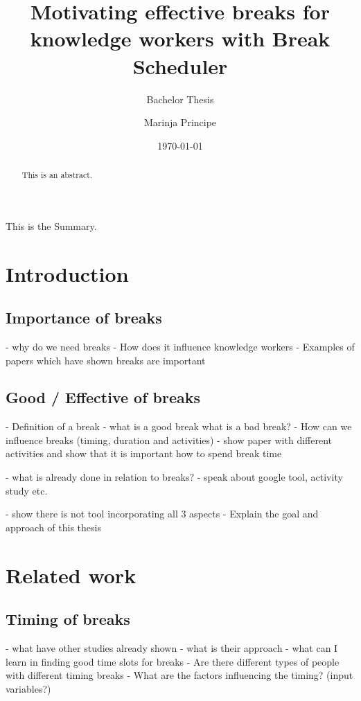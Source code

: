 \documentclass{hasel_thesis}
\date{\today}
\title{Motivating effective breaks for knowledge workers with Break  Scheduler }
\subtitle{Bachelor Thesis}
\author{Marinja Principe}
\begin{document}
\cite{KIM198871}
\maketitle

\frontmatter

\begin{acknowledgements}
\end{acknowledgements}

\begin{abstract}
This is an abstract.
\end{abstract}

\begin{Summary}
This is the Summary.
\end{Summary}
    

\tableofcontents
\listoffigures
\listoftables
\lstlistoflistings

\mainmatter
\chapter{Introduction}
\section{Importance of breaks}
- why do we need breaks
- How does it influence knowledge workers
- Examples of papers which have shown breaks are important
\section{Good / Effective of breaks}
 - Definition of a break
 - what is a good break what is a bad break?
 - How can we influence breaks (timing, duration and activities)
    - show paper with different activities and show that it is important how to spend break time

 - what is already done in relation to breaks?
    - speak about google tool, activity study etc.

 - show there is not tool incorporating all 3 aspects
 - Explain the goal and approach of this thesis
 

\chapter{Related work}
\section{Timing of breaks}
- what have other studies already shown
- what is their approach
- what can I learn in finding good time slots for breaks
- Are there different types of people with different timing breaks
- What are the factors influencing the timing? (input variables?)
\end{document}
